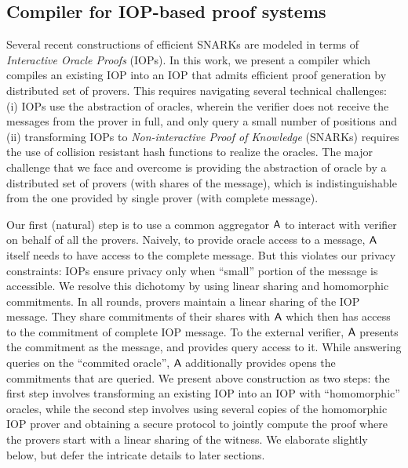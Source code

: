 \subsection{Compiler for IOP-based proof systems}
Several recent constructions of efficient SNARKs are modeled in terms of {\em Interactive Oracle Proofs} (IOPs). In this work, we present a compiler which compiles an existing IOP into an IOP
that admits efficient proof generation by distributed set of provers. This requires navigating
several technical challenges: (i) IOPs use the abstraction of oracles, wherein the verifier does not receive the messages from the prover in full, and only query a small number of positions and
(ii) transforming IOPs to {\em Non-interactive Proof of Knowledge} (SNARKs) requires the use of
collision resistant hash functions to realize the oracles. The major challenge that we face and
overcome is providing the abstraction of oracle by a distributed set of provers (with shares of the message), which is indistinguishable from the one provided by single prover (with complete message). 

Our first (natural) step is to use a common aggregator $\mathsf{A}$ to interact with verifier on behalf of all the provers. Naively, to provide oracle access to a message, $\mathsf{A}$ itself needs to have access to the complete message. But this violates our privacy constraints: IOPs ensure privacy only
when ``small'' portion of the message is accessible. We resolve this dichotomy by using linear sharing and homomorphic commitments. In all rounds, provers maintain a linear sharing of the IOP message. They share commitments of their shares with $\mathsf{A}$ which then has access to the commitment of complete IOP message. To the external verifier, $\mathsf{A}$ presents the commitment as the message, and provides query access to it. While answering queries on the ``commited oracle'', $\mathsf{A}$ additionally provides opens the commitments that are queried. We present above construction as two steps: the first step involves transforming an existing IOP into an IOP with ``homomorphic'' oracles, while the second step involves using several copies of the homomorphic IOP prover and obtaining
a secure protocol to jointly compute the proof where the provers start with a linear sharing of the witness. We elaborate slightly below, but defer the intricate details to later sections.


